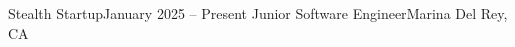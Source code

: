 \resumeSubheading
{Stealth Startup}{January 2025 -- Present}
{Junior Software Engineer}{Marina Del Rey, CA}
\resumeItemListStart

\resumeItemListEnd
